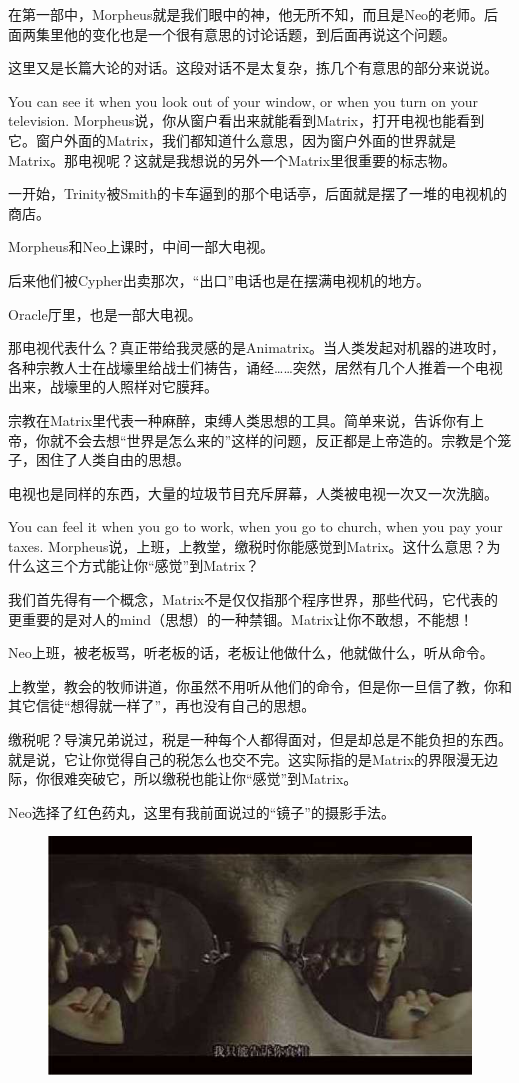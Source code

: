 \documentclass[UTF8]{ctexart}
\begin{document}
在第一部中，Morpheus就是我们眼中的神，他无所不知，而且是Neo的老师。后面两集里他的变化也是一个很有意思的讨论话题，到后面再说这个问题。

这里又是长篇大论的对话。这段对话不是太复杂，拣几个有意思的部分来说说。

You can see it when you look out of your window, or when you turn on your television. Morpheus说，你从窗户看出来就能看到Matrix，打开电视也能看到它。窗户外面的Matrix，我们都知道什么意思，因为窗户外面的世界就是Matrix。那电视呢？这就是我想说的另外一个Matrix里很重要的标志物。

一开始，Trinity被Smith的卡车逼到的那个电话亭，后面就是摆了一堆的电视机的商店。

Morpheus和Neo上课时，中间一部大电视。

后来他们被Cypher出卖那次，“出口”电话也是在摆满电视机的地方。

Oracle厅里，也是一部大电视。

那电视代表什么？真正带给我灵感的是Animatrix。当人类发起对机器的进攻时，各种宗教人士在战壕里给战士们祷告，诵经……突然，居然有几个人推着一个电视出来，战壕里的人照样对它膜拜。

宗教在Matrix里代表一种麻醉，束缚人类思想的工具。简单来说，告诉你有上帝，你就不会去想“世界是怎么来的”这样的问题，反正都是上帝造的。宗教是个笼子，困住了人类自由的思想。

电视也是同样的东西，大量的垃圾节目充斥屏幕，人类被电视一次又一次洗脑。

You can feel it when you go to work, when you go to church, when you pay your taxes. Morpheus说，上班，上教堂，缴税时你能感觉到Matrix。这什么意思？为什么这三个方式能让你“感觉”到Matrix？

我们首先得有一个概念，Matrix不是仅仅指那个程序世界，那些代码，它代表的更重要的是对人的mind（思想）的一种禁锢。Matrix让你不敢想，不能想！

Neo上班，被老板骂，听老板的话，老板让他做什么，他就做什么，听从命令。

上教堂，教会的牧师讲道，你虽然不用听从他们的命令，但是你一旦信了教，你和其它信徒“想得就一样了”，再也没有自己的思想。

缴税呢？导演兄弟说过，税是一种每个人都得面对，但是却总是不能负担的东西。就是说，它让你觉得自己的税怎么也交不完。这实际指的是Matrix的界限漫无边际，你很难突破它，所以缴税也能让你“感觉”到Matrix。

Neo选择了红色药丸，这里有我前面说过的“镜子”的摄影手法。

\begin{figure}[htb]
\centering
\includegraphics[width=0.5\linewidth]{fig/read_Matrix-19}
\end{figure}
\end{document}
